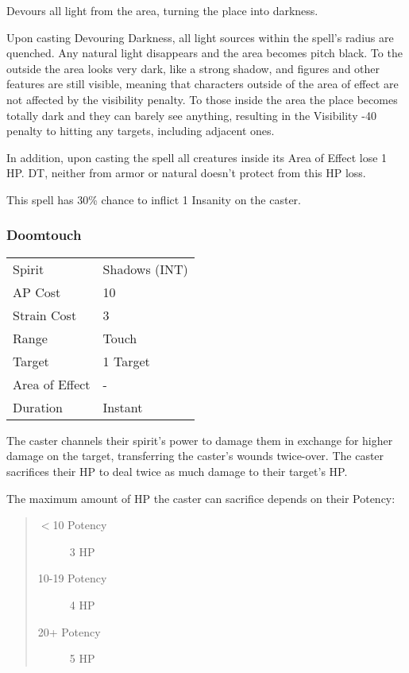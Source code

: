 \documentclass[11pt,a4paper,twocolumn]{book}
\begin{document}
\medskip

Devours all light from the area, turning the place into darkness.

Upon casting Devouring Darkness, all light sources within the spell's radius are quenched. Any natural light disappears and the area becomes pitch black. To the outside the area looks very dark, like a strong shadow, and figures and other features are still visible, meaning that characters outside of the area of effect are not affected by the visibility penalty. To those inside the area the place becomes totally dark and they can barely see anything, resulting in the Visibility -40 penalty to hitting any targets, including adjacent ones.

In addition, upon casting the spell all creatures inside its Area of Effect lose 1 HP. DT, neither from armor or natural doesn't protect from this HP loss.

This spell has 30\% chance to inflict 1 Insanity on the caster.


\subsubsection*{Doomtouch}
{
	\begin{tabu} to 75mm{| X[l,4] | X[l,7] |}
		\hline
		Spirit         & Shadows (INT) \\
		AP Cost        & 10            \\
		Strain Cost    & 3             \\
		Range          & Touch         \\
		Target         & 1 Target      \\
		Area of Effect & -             \\
		Duration       & Instant       \\ \hline
	\end{tabu}
	
}

\medskip

The caster channels their spirit's power to damage them in exchange for higher damage on the target, transferring the caster's wounds twice-over. The caster sacrifices their HP to deal twice as much damage to their target's HP.

The maximum amount of HP the caster can sacrifice depends on their Potency:
\begin{quote}
	\begin{description}
		\item[$<$10 Potency] 	3 HP
		\item[10-19 Potency] 	4 HP
		\item[20+ Potency] 	5 HP
	\end{description}
\end{quote}
\end{document}
